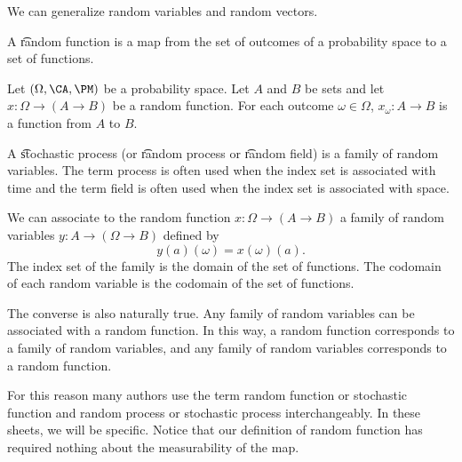 

We can generalize random variables and random vectors.


A \t{random function} is a map from the set of outcomes of a probability space to a set of functions.


Let $(\Omega, \CA, \PM)$ be a probability space.
Let $A$ and $B$ be sets and let $x: \Omega \to (A \to B)$ be a random function.
For each outcome $\omega \in \Omega$, $x_{\omega}: A \to B$ is a function from $A$ to $B$.


A \t{stochastic process} (or \t{random process} or \t{random field}) is a family of random variables.
The term process is often used when the index set is associated with time and the term field is often used when the index set is associated with space.

We can associate to the random function $x: \Omega \to (A \to B)$ a family of random variables $y: A \to (\Omega \to B)$ defined by
\[
  y(a)(\omega) = x(\omega)(a).
\]
The index set of the family is the domain of the set of functions.
The codomain of each random variable is the codomain of the set of functions.

The converse is also naturally true.
Any family of random variables can be associated with a random function.
In this way, a random function corresponds to a family of random variables, and any family of random variables corresponds to a random function.

For this reason many authors use the term random function or stochastic function and random process or stochastic process interchangeably.
In these sheets, we will be specific.
Notice that our definition of random function has required nothing about the measurability of the map.

\blankpage
